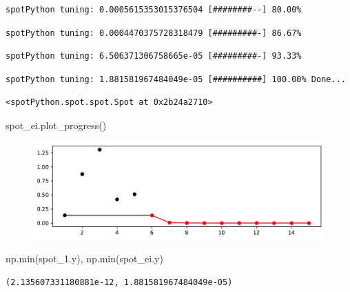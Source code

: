 \documentclass[
  letterpaper,
  DIV=11,
  numbers=noendperiod]{scrreprt}
\newenvironment{Shaded}{\begin{snugshade}}{\end{snugshade}}
\newcommand{\BuiltInTok}[1]{\textcolor[rgb]{0.00,0.23,0.31}{#1}}
\newcommand{\NormalTok}[1]{\textcolor[rgb]{0.00,0.23,0.31}{#1}}
\begin{document}
\begin{verbatim}
spotPython tuning: 0.0005615353015376504 [########--] 80.00% 
\end{verbatim}

\begin{verbatim}
spotPython tuning: 0.0004470375728318479 [#########-] 86.67% 
\end{verbatim}

\begin{verbatim}
spotPython tuning: 6.506371306758665e-05 [#########-] 93.33% 
\end{verbatim}

\begin{verbatim}
spotPython tuning: 1.881581967484049e-05 [##########] 100.00% Done...
\end{verbatim}

\begin{verbatim}
<spotPython.spot.spot.Spot at 0x2b24a2710>
\end{verbatim}

\begin{Shaded}
\begin{Highlighting}[]
\NormalTok{spot\_ei.plot\_progress()}
\end{Highlighting}
\end{Shaded}

\begin{figure}[H]

{\centering \includegraphics{012_num_spot_ei_files/figure-pdf/cell-19-output-1.pdf}

}

\end{figure}

\begin{Shaded}
\begin{Highlighting}[]
\NormalTok{np.}\BuiltInTok{min}\NormalTok{(spot\_1.y), np.}\BuiltInTok{min}\NormalTok{(spot\_ei.y)}
\end{Highlighting}
\end{Shaded}

\begin{verbatim}
(2.135607331180881e-12, 1.881581967484049e-05)
\end{verbatim}
\end{document}
